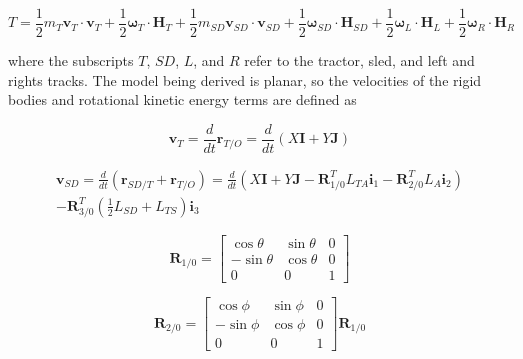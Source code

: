 \begin{linenomath*}
    \begin{equation}
        T = \frac{1}{2}m_T\mathbf{v}_T\cdot\textbf{v}_T + \frac{1}{2}\boldsymbol{\omega}_T\cdot\mathbf{H}_T + \frac{1}{2}m_{SD}\mathbf{v}_{SD}\cdot\textbf{v}_{SD} + \frac{1}{2}\boldsymbol{\omega}_{SD}\cdot\mathbf{H}_{SD} + \frac{1}{2}\boldsymbol{\omega}_L\cdot\mathbf{H}_L + \frac{1}{2}\boldsymbol{\omega}_R\cdot\mathbf{H}_R
    \end{equation}
\end{linenomath*}
where the subscripts $T$, $SD$, $L$, and $R$ refer to the tractor, sled, and left and rights tracks. The model being derived is planar, so the velocities of the rigid bodies and rotational kinetic energy terms are defined as
\begin{linenomath*}
    \begin{equation}
        \mathbf{v}_T = \frac{d}{dt}\mathbf{r}_{T/O} = \frac{d}{dt}(X\mathbf{I} + Y\mathbf{J})
    \end{equation}
\end{linenomath*}
\begin{linenomath*}
    \begin{multline}
        \mathbf{v}_{SD} = \frac{d}{dt}(\mathbf{r}_{SD/T} + \mathbf{r}_{T/O})
                        = \frac{d}{dt}(X\mathbf{I} + Y\mathbf{J}  - \mathbf{R}_{1/0}^TL_{TA}\mathbf{i}_1  - \mathbf{R}_{2/0}^TL_A\mathbf{i}_2) \\
                        - \mathbf{R}_{3/0}^T(\frac{1}{2}L_{SD} + L_{TS})\mathbf{i}_3
    \end{multline}
\end{linenomath*}
\begin{linenomath*}
    \begin{equation}
        \mathbf{R}_{1/0} = \begin{bmatrix} \cos\theta & \sin\theta & 0 \\ -\sin\theta & \cos\theta & 0 \\ 0 & 0 & 1 \end{bmatrix}
    \end{equation}
\end{linenomath*}
\begin{linenomath*}
    \begin{equation}
        \mathbf{R}_{2/0} = \begin{bmatrix} \cos\phi & \sin\phi & 0 \\ -\sin\phi & \cos\phi & 0 \\ 0 & 0 & 1 \end{bmatrix}\mathbf{R}_{1/0}
    \end{equation}
\end{linenomath*}
